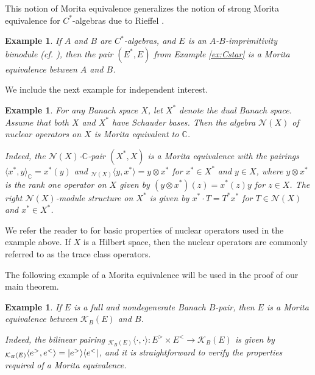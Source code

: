 \documentclass[a4,11pt]{amsart}
\newtheorem{ex}[thm]{Example}
\theoremstyle{remark}
\DeclarePairedDelimiter\bra{\langle}{\rvert}
\DeclarePairedDelimiter\ket{\lvert}{\rangle}
\begin{document}
This notion of Morita equivalence generalizes the notion of strong Morita equivalence for $C^*$-algebras due to Rieffel \cite{Rie74}.
\begin{ex}
If $A$ and $B$ are $C^*$-algebras, and $E$ is an $A$-$B$-imprimitivity bimodule (cf. \cite[Definition 3.1]{RW}), then the pair $(E^*,E)$ from Example \ref{ex:Cstar} is a Morita equivalence between $A$ and $B$.
\end{ex}

We include the next example for independent interest.

\begin{ex}
For any Banach space $X$, let $X^*$ denote the dual Banach space. Assume that both $X$ and $X^*$ have Schauder bases. Then the algebra $\mathcal{N}(X)$ of nuclear operators on $X$ is Morita equivalent to $\mathbb{C}$. 

Indeed, the $\mathcal{N}(X)$-$\mathbb{C}$-pair $(X^*,X)$ is a Morita equivalence with the pairings $\langle x^*,y \rangle_\mathbb{C}=x^*(y)$ and ${}_{\mathcal{N}(X)}\langle y,x^* \rangle=y\otimes x^*$ for $x^*\in X^*$ and $y\in X$, where $y\otimes x^*$ is the rank one operator on $X$ given by $(y\otimes x^*)(z)=x^*(z)y$ for $z\in X$.
The right $\mathcal{N}(X)$-module structure on $X^*$ is given by $x^*\cdot T=T^*x^*$ for $T\in\mathcal{N}(X)$ and $x^*\in X^*$.
\end{ex}

We refer the reader to \cite[Propositions 47.2 and 47.5]{Tre} for basic properties of nuclear operators used in the example above.
If $X$ is a Hilbert space, then the nuclear operators are commonly referred to as the trace class operators.



The following example of a Morita equivalence will be used in the proof of our main theorem.

\begin{ex} \label{ex:compact}
If $E$ is a full and nondegenerate Banach $B$-pair, then $E$ is a Morita equivalence between $\mathcal{K}_B(E)$ and $B$.

Indeed, the bilinear pairing ${}_{\mathcal{K}_B(E)}\langle\cdot,\cdot\rangle:E^>\times E^<\rightarrow\mathcal{K}_B(E)$ is given by ${}_{\mathcal{K}_B(E)}\langle e^>,e^<\rangle=\ket{e^>}\bra{e^<}$, and it is straightforward to verify the properties required of a Morita equivalence.
\end{ex}
\end{document}
